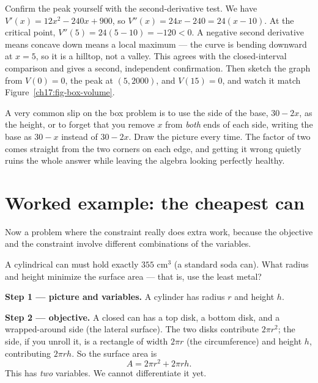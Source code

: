 \begin{labbox}
Confirm the peak yourself with the second-derivative test. We have $V'(x)=12x^2-240x
+900$, so $V''(x)=24x-240=24(x-10)$. At the critical point, $V''(5)=24(5-10)=-120<0$.
A negative second derivative means concave down means a local maximum --- the curve
is bending downward at $x=5$, so it is a hilltop, not a valley. This agrees with the
closed-interval comparison and gives a second, independent confirmation. Then sketch
the graph from $V(0)=0$, the peak at $(5,2000)$, and $V(15)=0$, and watch it match
Figure~\ref{ch17:fig-box-volume}.
\end{labbox}

\begin{trapbox}
A very common slip on the box problem is to use the side of the base, $30-2x$, as the
height, or to forget that you remove $x$ from \emph{both} ends of each side, writing
the base as $30-x$ instead of $30-2x$. Draw the picture every time. The factor of two
comes straight from the two corners on each edge, and getting it wrong quietly ruins
the whole answer while leaving the algebra looking perfectly healthy.
\end{trapbox}

\section{Worked example: the cheapest can}

Now a problem where the constraint really does extra work, because the objective and
the constraint involve different combinations of the variables.

\begin{example}\label{ch17:ex-can}
A cylindrical can must hold exactly $355$ cm$^3$ (a standard soda can). What radius
and height minimize the surface area --- that is, use the least metal?
\end{example}

\textbf{Step 1 --- picture and variables.} A cylinder has radius $r$ and height $h$.

\textbf{Step 2 --- objective.} A closed can has a top disk, a bottom disk, and a
wrapped-around side (the lateral surface). The two disks contribute $2\pi r^2$; the
side, if you unroll it, is a rectangle of width $2\pi r$ (the circumference) and
height $h$, contributing $2\pi r h$. So the surface area is
\[
A = 2\pi r^2 + 2\pi r h.
\]
This has \emph{two} variables. We cannot differentiate it yet.

